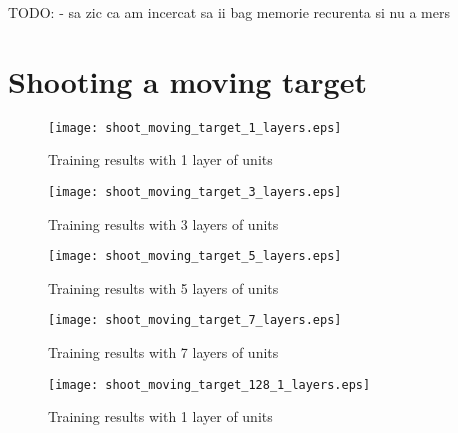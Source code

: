 TODO:
- sa zic ca am incercat sa ii bag memorie recurenta si nu a mers


\section{Shooting a moving target}

\begin{figure}
    \begin{center}
        \texttt{[image: shoot\_moving\_target\_1\_layers.eps]}
        \caption{Training results with 1 layer of units}
        \label{train_results_shoot_1_layers}
    \end{center}
\end{figure}

\begin{figure}
    \begin{center}
        \texttt{[image: shoot\_moving\_target\_3\_layers.eps]}
        \caption{Training results with 3 layers of units}
        \label{train_results_shoot_3_layers}
    \end{center}
\end{figure}

\begin{figure}
    \begin{center}
        \texttt{[image: shoot\_moving\_target\_5\_layers.eps]}
        \caption{Training results with 5 layers of units}
        \label{train_results_shoot_5_layers}
    \end{center}
\end{figure}

\begin{figure}
    \begin{center}
        \texttt{[image: shoot\_moving\_target\_7\_layers.eps]}
        \caption{Training results with 7 layers of units}
        \label{train_results_shoot_7_layers}
    \end{center}
\end{figure}



\begin{figure}
    \begin{center}
        \texttt{[image: shoot\_moving\_target\_128\_1\_layers.eps]}
        \caption{Training results with 1 layer of units}
        \label{train_results_shoot_obs_comparasion_1_layers}
    \end{center}
\end{figure}


